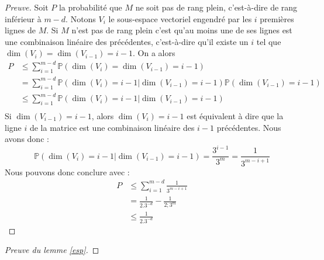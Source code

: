 \documentclass[12pt]{article}
\theoremstyle{plain}
\begin{document}
\begin{appendix}
\begin{proof}[Preuve]
Soit $P$ la probabilité que $M$ ne soit pas de rang plein, c'est-à-dire de rang inférieur à $m-d$.
Notons $V_i$ le sous-espace vectoriel engendré par les $i$ premières lignes de $M$. Si $M$ n'est pas de rang plein c'est qu'au moins une de ses lignes est une combinaison linéaire des précédentes, c'est-à-dire qu'il existe un $i$ tel que $\dim(V_i) = \dim(V_{i-1}) = i-1$. On a alors
\begin{equation*}
\begin{split}
P &\leq \sum\limits_{i=1}^{m-d} \mathbb{P}(\dim(V_i) = \dim(V_{i-1}) = i-1) \\
&= \sum\limits_{i=1}^{m-d} \mathbb{P}(\dim(V_i) =i-1 | \dim(V_{i-1}) = i-1)\mathbb{P}(\dim(V_{i-1}) = i-1) \\
&\leq \sum\limits_{i=1}^{m-d} \mathbb{P}(\dim(V_i) =i-1 | \dim(V_{i-1}) = i-1) \\
\end{split}
\end{equation*}
Si $\dim(V_{i-1}) = i-1$, alors $\dim(V_i) = i-1$ est équivalent à dire que la ligne $i$ de la matrice est une combinaison linéaire des $i-1$ précédentes. Nous avons donc :
$$ \mathbb{P}(\dim(V_i) =i-1 | \dim(V_{i-1}) = i-1) = \frac{3^{i-1}}{3^m} = \frac{1}{3^{m-i+1}} $$
Nous pouvons donc conclure avec :
\begin{equation*}
\begin{split}
P &\leq \sum\limits_{i=1}^{m-d} \frac{1}{3^{m-i+1}}\\
& = \frac{1}{2.3^{-d}} - \frac{1}{2;3^m}\\
&\leq  \frac{1}{2.3^{-d}} 
\end{split}
\end{equation*}
\end{proof}

\begin{proof}[Preuve du lemme \ref{esp}]


\end{proof}
\end{appendix}
\end{document}
